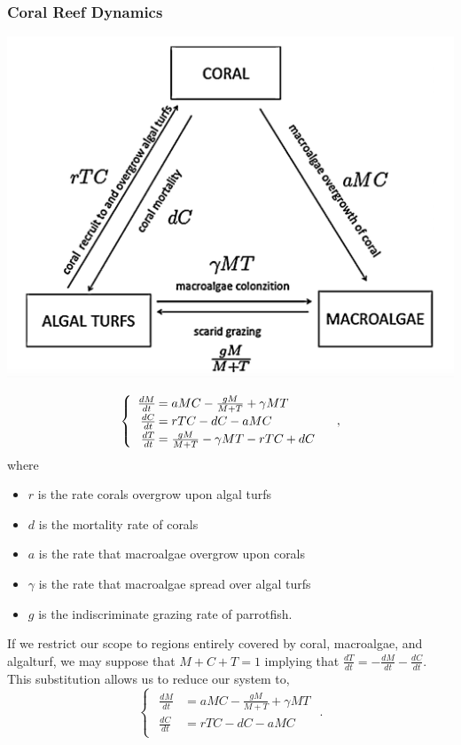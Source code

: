 \begin{frame}
\frametitle{Coral Reef Dynamics}
\includegraphics[natwidth=162bp,natheight=227bp,width=280bp]{./coral-reef-triangle.png}
\end{frame}
\begin{frame}
$$\begin{cases}\begin{array}{rl}
\frac{dM}{dt}\hspace{-.8em}&=aMC - \frac{gM}{M+T}+\gamma M T\\
\frac{dC}{dt}\hspace{-.8em}&=rTC - dC - aMC\\
\frac{dT}{dt}\hspace{-.8em}&=\frac{gM}{M + T} - \gamma MT - rTC + dC
\end{array}\end{cases},$$ where \begin{itemize}\itemsep0pt
\item $r$ is the rate corals overgrow upon algal turfs\\
\item $d$ is the mortality rate of corals\\
\item $a$ is the rate that macroalgae overgrow upon corals\\
\item $\gamma$ is the rate that macroalgae spread over algal turfs\\
\item $g$ is the indiscriminate grazing rate of parrotfish.
\end{itemize}
\end{frame}

\begin{frame}
If we restrict our scope to regions entirely covered by coral, macroalgae, and algalturf, we may suppose that $M+C+T=1$ implying that  $\frac{dT}{dt}=-\frac{dM}{dt}-\frac{dC}{dt}$. This substitution allows us to  reduce our system to, $$\begin{cases} 
\begin{array}{rl}
\frac{dM}{dt}&= aMC-\frac{gM}{M+T} + \gamma MT\\ 
\frac{dC}{dt}&=rTC-dC-aMC
\end{array} \end{cases}.$$ 
\end{frame}

